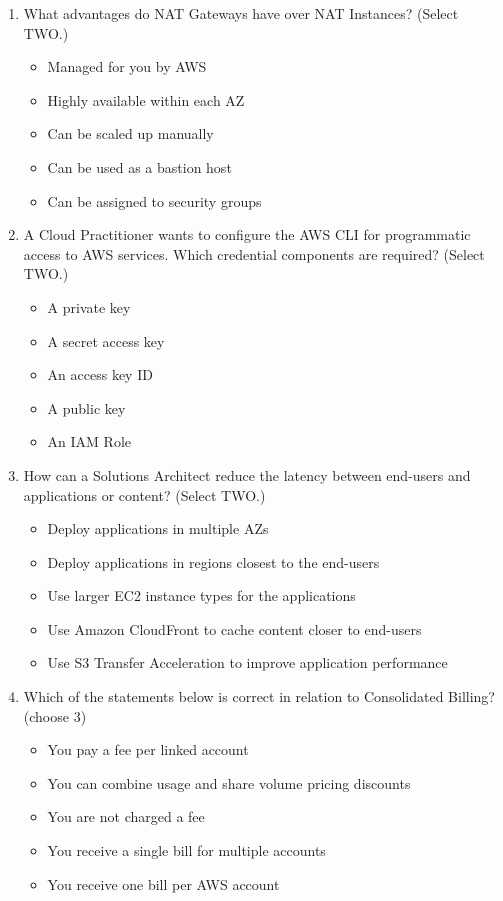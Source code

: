 \begin{enumerate}
	\item What advantages do NAT Gateways have over NAT Instances? (Select TWO.)
	\begin{itemize}
		\item Managed for you by AWS
		\item Highly available within each AZ
		\item Can be scaled up manually
		\item Can be used as a bastion host
		\item Can be assigned to security groups
	\end{itemize}

	\item A Cloud Practitioner wants to configure the AWS CLI for programmatic access to AWS services. Which credential components are required? (Select TWO.)
	\begin{itemize}
		\item A private key
		\item A secret access key
		\item An access key ID
		\item A public key
		\item An IAM Role
	\end{itemize}

	\item How can a Solutions Architect reduce the latency between end-users and applications or content? (Select TWO.)
	\begin{itemize}
		\item Deploy applications in multiple AZs
		\item Deploy applications in regions closest to the end-users
		\item Use larger EC2 instance types for the applications
		\item Use Amazon CloudFront to cache content closer to end-users
		\item Use S3 Transfer Acceleration to improve application performance
	\end{itemize}

	\item Which of the statements below is correct in relation to Consolidated Billing? (choose 3)
	\begin{itemize}
		\item You pay a fee per linked account
		\item You can combine usage and share volume pricing discounts
		\item You are not charged a fee
		\item You receive a single bill for multiple accounts
		\item You receive one bill per AWS account
	\end{itemize}


\end{enumerate}
